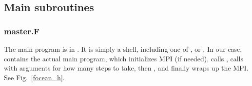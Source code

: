 \subsection{Main subroutines}
\label{Master}

\subsubsection{master.F}
The main program is in . It is simply a shell, including
one of ,  or . In
our case,  contains the actual main program, which
initializes MPI (if needed), calls ,
calls  with arguments for how many steps to take,
then , and finally wraps up the MPI.
See Fig.\ \ref{focean_h}.

